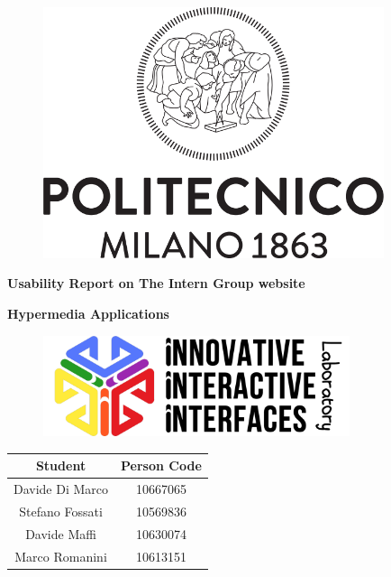 \documentclass[11pt, letterpaper]{article}
\begin{document}
    \begin{titlepage}
        \begin{center}
        \vspace*{1cm}
            \begin{figure}
                \centering
               \includegraphics[width=10cm]{images/logos/Logo_Politecnico_Milano.png}
            \end{figure}
            
            \huge
            \textbf{Usability Report on The Intern Group website}

            \vspace{1cm}
        
            \Large
            \textbf{Hypermedia Applications}

            \vspace{1.5cm}

            \begin{figure}[H]
                \centering
                \includegraphics[width=9cm]{images/logos/i3lab.png}
            \end{figure}

            \vspace{2cm}

            \begin{tabular}{c|c}
                Student & Person Code\\
                \hline\hline
                Davide Di Marco & 10667065\\
                Stefano Fossati & 10569836\\
                Davide Maffi & 10630074\\
                Marco Romanini & 10613151
            \end{tabular}
            \large
            
        \end{center}
    \end{titlepage}
\end{document}
